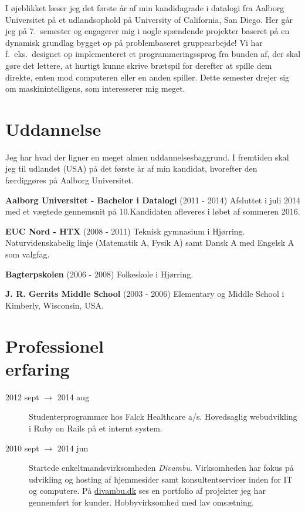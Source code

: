 \documentclass[margin,line,a4paper]{resume}
\begin{document}
\begin{resume}
    I øjeblikket læser jeg det første år af min kandidagrade i datalogi
    fra Aalborg Universitet på et udlandsophold på University of
    California, San Diego. Her går jeg på 7.\ semester og engagerer mig
    i nogle spændende projekter baseret på en dynamisk grundlag bygget
    op på problembaseret gruppearbejde! Vi har f.\ eks.\ designet op
    implementeret et programmeringssprog fra bunden af, der skal gøre
    det lettere, at hurtigt kunne skrive brætspil for derefter at spille
    dem direkte, enten mod computeren eller en anden spiller. Dette
    semester drejer sig om maskinintelligens, som interesserer mig
    meget.

    \section{\mysidestyle Uddannelse}
    Jeg har hvad der ligner en meget almen uddannelsesbaggrund. I
    fremtiden skal jeg til udlandet (USA) på det første år af min
    kandidat, hvorefter den færdiggøres på Aalborg Universitet.

    \textbf{Aalborg Universitet - Bachelor i Datalogi}
      (2011 - 2014) Afsluttet i juli 2014 med et vægtede gennemsnit på
      10.Kandidaten afleveres i løbet af sommeren 2016.

    \textbf{EUC Nord - HTX} (2008 - 2011) Teknisk gymnasium i Hjørring.
      Naturvidenskabelig linje (Matematik A, Fysik A) samt Dansk A med
      Engelsk A som valgfag.

    \textbf{Bagterpskolen} (2006 - 2008) Folkeskole i Hjørring.

    \textbf{J. R. Gerrits Middle School} (2003 - 2006) Elementary og
      Middle School i Kimberly, Wisconsin, USA.

\section{\mysidestyle Professionel\\erfaring}\vspace{1mm}
\begin{description}

  \item[2012 sept $\rightarrow$ 2014 aug] Studenterprogrammør hos Falck
    Healthcare a/s. Hovedsaglig webudvikling i Ruby on Rails på et internt
    system.

  \item[2010 sept $\rightarrow$ 2014 jun] Startede enkeltmandsvirksomheden
    \emph{Divambu}. Virksomheden har fokus på udvikling og hosting af
    hjemmesider samt konsultentservicer inden for IT og computere. På
    \url{divambu.dk} ses en portfolio af projekter jeg har gennemført for
    kunder. Hobbyvirksomhed med lav omsætning.


\end{description}
\end{resume}
\end{document}
